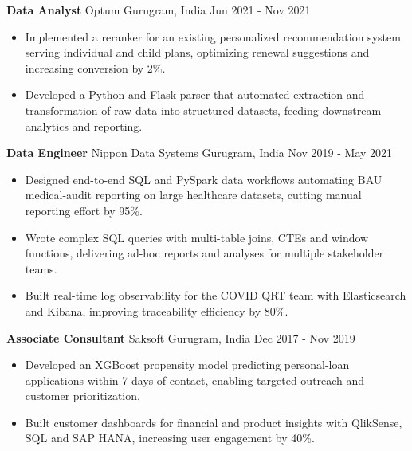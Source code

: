 \documentclass[10pt,a4paper]{article}
\newcommand{\role}[4]{\textbf{#1} \textbar{} #2 \hfill #3 \textbar{} #4\par}
\begin{document}
\vspace{3pt}
\role{Data Analyst}{Optum}{Gurugram, India}{Jun 2021 - Nov 2021}
\begin{itemize}
  \item Implemented a reranker for an existing personalized recommendation system serving individual and child plans, optimizing renewal suggestions and increasing conversion by 2\%.
  \item Developed a Python and Flask parser that automated extraction and transformation of raw data into structured datasets, feeding downstream analytics and reporting.
\end{itemize}
\vspace{3pt}
\role{Data Engineer}{Nippon Data Systems}{Gurugram, India}{Nov 2019 - May 2021}
\begin{itemize}
  \item Designed end-to-end SQL and PySpark data workflows automating BAU medical-audit reporting on large healthcare datasets, cutting manual reporting effort by 95\%.
  \item Wrote complex SQL queries with multi-table joins, CTEs and window functions, delivering ad-hoc reports and analyses for multiple stakeholder teams.
  \item Built real-time log observability for the COVID QRT team with Elasticsearch and Kibana, improving traceability efficiency by 80\%.
\end{itemize}
\vspace{3pt}
\role{Associate Consultant}{Saksoft}{Gurugram, India}{Dec 2017 - Nov 2019}
\begin{itemize}
  \item Developed an XGBoost propensity model predicting personal-loan applications within 7 days of contact, enabling targeted outreach and customer prioritization.
  \item Built customer dashboards for financial and product insights with QlikSense, SQL and SAP HANA, increasing user engagement by 40\%.
\end{itemize}
\end{document}
